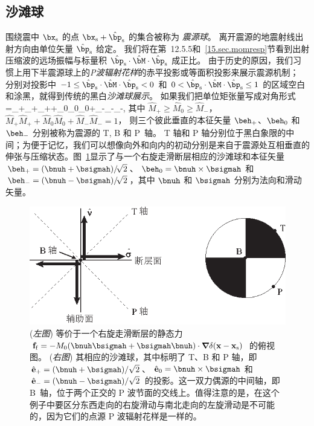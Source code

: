 \subsection{沙滩球}
%

围绕震中 $\bx_{\rm s}$ 的点 $\bx_{\rm s}+\hat{\bp}_{\rm s}$ 的集合被称为 {\em 震源球\/}。
%
离开震源的地震射线出射方向由单位矢量 $\hat{\bp}_{\rm s}$ 给定。
我们将在第~12.5.5和~\ref{15.sec.momresp}节看到出射压缩波的远场振幅与标量积 $\hat{\bp}_{\rm s}\cdot\hat{\bM}\cdot\hat{\bp}_{\rm s}$ 成正比。
由于历史的原因，我们习惯上用下半震源球上的{\em P波辐射花样\/}的赤平投影或等面积投影来展示震源机制；
%
分别对投影中 $-1\leq\hat{\bp}_{\rm s}\cdot\hat{\bM}\cdot\hat{\bp}_{\rm s}<0$ 和 $0<\hat{\bp}_{\rm s}\cdot\hat{\bM}\cdot\hat{\bp}_{\rm s}\leq 1$ 的区域空白和涂黑，就得到传统的黑白{\em 沙滩球展示\/}。
%
如果我们把单位矩张量写成对角形式
\eq
\hat{\bM}=_+\beh_+\beh_++_0\beh_0\beh_0+_-\beh_-\beh_-,
\en
其中 $\hat{M}_+\geq\hat{M}_0\geq\hat{M}_-$，
$\hat{M}_+\hat{M}_++\hat{M}_0\hat{M}_0+\hat{M}_-\hat{M}_-=1$，
则三个彼此垂直的本征矢量
$\beh_+$、$\beh_0$ 和 $\beh_-$ 分别被称为震源的
T, B 和 P~轴。
%
%
%
%
%
%
%
%
T 轴和 P 轴分别位于黑白象限的中间；为便于记忆，我们可以想像向外和向内的初动分别是来自于震源处互相垂直的伸张与压缩状态。图~\ref{fig5.7}显示了与一个右旋走滑断层相应的沙滩球和本征矢量 $\beh_+=(\bnuh+\bsigmah)/\!\sqrt{2}$、
$\beh_0=\bnuh\times\bsigmah$ 和 $\beh_-=(\bnuh-\bsigmah)/\!\sqrt{2}$，其中 $\bnuh$ 和 $\bsigmah$ 分别为法向和滑动矢量。
\begin{figure}
\begin{center}
\includegraphics{../figures/chap05/fig07.eps}
\end{center}
\caption[beachball1]{\label{fig5.7}
({\em 左图\/}) 等价于一个右旋走滑断层的静态力
${\bf f}_{\rm f}=-M_0(\bnuh\bsigmah+
\bsigmah\bnuh)\cdot{\mbox{\boldmath $\nabla$}}\hspace{-0.2 mm}
\delta({\bf x}-{\bf x}_{\rm s})$ 的俯视图。
({\em 右图\/}) 其相应的沙滩球，其中标明了 T、B 和 P 轴，即
$\hat{\bf e}_+=(\bnuh+\bsigmah)/\sqrt{2}$、
$\hat{\bf e}_0=\bnuh\times\bsigmah$ 和
$\hat{\bf e}_-=(\bnuh-\bsigmah)/\sqrt{2}$ 的投影。这一双力偶源的中间轴，即
B~轴，位于两个正交的 P 波节面的交线上。值得注意的是，在这个例子中要区分东西走向的右旋滑动与南北走向的左旋滑动是不可能的，因为它们的点源 P 波辐射花样是一样的。
%
}
\end{figure}

